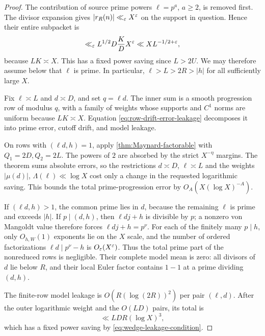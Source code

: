 \begin{proof}
The contribution of source prime powers $\ell=p^a$, $a\ge2$, is removed
first.  The divisor expansion gives $|r_R(n)|\ll_\varepsilon X^\varepsilon$ on the
support in question.  Hence their entire subpacket is
\begin{equation}
 \ll_\varepsilon
 L^{1/2}D\frac KD X^\varepsilon
 \ll X L^{-1/2+\varepsilon},
 \label{eq:source-prime-power-wedge}
\end{equation}
because $LK\asymp X$.  This has a fixed power saving since $L>2U$.
We may therefore assume below that $\ell$ is prime.  In particular,
$\ell>L>2R>|h|$ for all sufficiently large $X$.

Fix $\ell\asymp L$ and $d\asymp D$, and set $q=\ell d$.  The inner sum
is a smooth progression row of modulus $q$, with a family of weights
whose supports and $C^1$ norms are uniform because $LK\asymp X$.
Equation \eqref{eq:row-drift-error-leakage} decomposes it into prime error,
cutoff drift, and model leakage.

On rows with $(\ell d,h)=1$, apply
\cref{thm:Maynard-factorable} with $Q_1=2D,Q_2=2L$.  The powers of $2$ are
absorbed by the strict $X^{-\eta}$ margins.  The theorem sums absolute
errors, so the restrictions $d\asymp D$, $\ell\asymp L$ and the weights
$|\mu(d)|$, $\Lambda(\ell)\ll\log X$ cost only a change in the requested
logarithmic saving.  This bounds the total prime-progression error by
$O_A(X(\log X)^{-A})$.

If $(\ell d,h)>1$, the common prime lies in $d$, because the remaining
$\ell$ is prime and exceeds $|h|$.  If $p\mid(d,h)$, then
$\ell dj+h$ is divisible by $p$; a nonzero von Mangoldt value therefore
forces $\ell dj+h=p^\nu$.  For each of the finitely many $p\mid h$, only
$O_{h,W}(1)$ exponents lie on the $X$ scale, and the number of ordered
factorizations $\ell d\mid p^\nu-h$ is $O_\varepsilon(X^\varepsilon)$.  Thus the total
prime part of the nonreduced rows is negligible.  Their complete model
mean is zero: all divisors of $d$ lie below $R$, and their local Euler
factor contains $1-1$ at a prime dividing $(d,h)$.

The finite-row model leakage is
$O(R(\log(2R))^2)$ per pair $(\ell,d)$.  After the outer logarithmic
weight and the $O(LD)$ pairs, its total is
\begin{equation}
 \ll LDR(\log X)^3,
 \label{eq:aggregate-model-leakage-wedge}
\end{equation}
which has a fixed power saving by \eqref{eq:wedge-leakage-condition}.


\end{proof}
